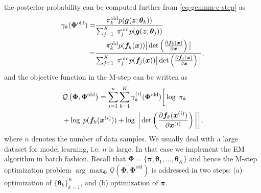 the posterior probability can be computed further from \autoref{eq-genmm-e-step} as
\begin{align}\label{eq-genmm-gamma}
  \gamma_k({\bm{\Phi}}^{\mathrm{old}}) %
  = & \frac{\pi_k^{\mathrm{old}} p(\bm{g}(\bm{z};\bm{\theta}_k))}{\sum_{j=1}^K\;
      \pi_j^{\mathrm{old}} p(\bm{g}(\bm{z};\bm{\theta}_j))} \nonumber\\
  = &\frac{\pi_k^{\mathrm{old}} p(\bm{f}_k(\bm{x})) \big|\det\left( \pd{\bm{f}_k(\bm{x})}{\bm{x}} \right)\big|}{\sum_{j=1}^K\; \pi_j^{\mathrm{old}} p(\bm{f}_j(\bm{x})) \big|\det\left( \pd{\bm{f}_j(\bm{x})}{\bm{x}} \right)\big|},
\end{align}
and the objective function in the M-step can be written as
\begin{align}\label{eq-genmm-obj}
  &\mathcal{Q}\left(\bm{\Phi},\bm{\Phi}^{\mathrm{old}}\right)  =\sum_{i=1}^n \sum_{k=1}^{K}\gamma_k^{(i)}(\bm{\Phi}^{\mathrm{old}})\bigg[ \log\;\pi_k 
    \nonumber\\ &+\log\;p(\bm{f}_k(\bm{x}^{(i)})) 
                  + \log\;\bigg|\det\left(\frac{ \partial \bm{f}_k(\bm{x}^{(i)})}{\partial \bm{x}^{(i)}} \right)\bigg|\bigg],
\end{align}
where $n$ denotes the number of data samples. We usually deal with a large dataset for model learning, i.e. $n$ is large. In that case we implement the EM algorithm in batch fashion. 
Recall that $ \bm{\Phi}= \{\bm{\pi},\bm{\theta}_1, \dots, \bm{\theta}_K \}$ and hence the M-step optimization problem $\arg \max_{\bm{\Phi}} \mathcal{Q} (\bm{\Phi},\bm{\Phi}^{\mathrm{old}})$ is addressed in two steps: (a) optimization of $\{ \bm{\theta}_k \}_{k=1}^{K}$, and (b) optimization of $\bm{\pi}$.



